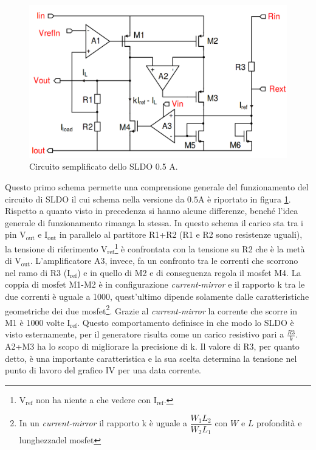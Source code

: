 \begin{figure}
\centering
\includegraphics[scale=.3]{Immagini/SLDO5A}
\caption{Circuito semplificato dello SLDO 0.5 A.}
\label{SLDO5A}
\end{figure}

Questo primo schema permette una comprensione generale del funzionamento del circuito di SLDO il cui schema nella versione da $\mathrm{0.5 A}$ è riportato in figura \ref{SLDO5A}. Rispetto a quanto visto in precedenza si hanno alcune differenze, benché l'idea generale di funzionamento rimanga la stessa. 
In questo schema il carico sta tra i pin $\mathrm{V_{out}}$ e $\mathrm{I_{out}}$ in parallelo al partitore R1+R2 (R1 e R2 sono resistenze uguali), la tensione di riferimento $\mathrm{V_{ref}}$\footnote{$\mathrm{V_{ref}}$ non ha niente a che vedere con $\mathrm{I_{ref}}$.} è confrontata con la tensione su R2 che è la metà di $\mathrm{V_{out}}$. L'amplificatore A3, invece, fa un confronto tra le correnti che scorrono nel ramo di R3 ($\mathrm{I_{ref}}$) e in quello di M2 e di conseguenza regola il mosfet M4. 
La coppia di mosfet M1-M2 è in configurazione \textit{current-mirror} e il rapporto k tra le due correnti è uguale a 1000, quest'ultimo dipende solamente dalle caratteristiche geometriche dei due mosfet\footnote{In un \textit{current-mirror} il rapporto k è uguale a $\dfrac{W_1L_2}{W_2L_1}$ con $W$ e $L$ profondità e lunghezzadel mosfet}. 
Grazie al \textit{current-mirror} la corrente che scorre in M1 è 1000 volte $\mathrm{I_{ref}}$. Questo comportamento definisce in che modo lo SLDO è visto esternamente, per il generatore risulta come un carico resistivo pari a $\frac{R3}{k}$. 
A2+M3 ha lo scopo di migliorare la precisione di k. 
Il valore di R3, per quanto detto, è una importante caratteristica e la sua scelta determina la tensione nel punto di lavoro del grafico IV per una data corrente. 

